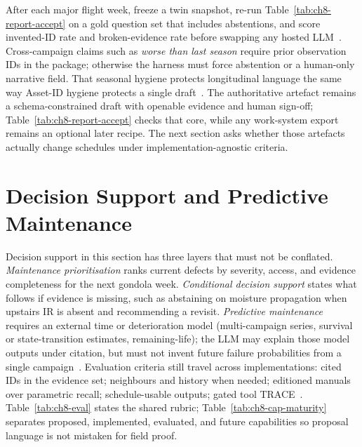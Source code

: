 After each major flight week, freeze a twin snapshot, re-run Table~\ref{tab:ch8-report-accept} on a gold question set that includes abstentions, and score invented-ID rate and broken-evidence rate before swapping any hosted LLM~\cite{liang2023helm,zhang2025}. Cross-campaign claims such as \emph{worse than last season} require prior observation IDs in the package; otherwise the harness must force abstention or a human-only narrative field. That seasonal hygiene protects longitudinal language the same way Asset-ID hygiene protects a single draft~\cite{chen2023facility,krutli2025fmrags}. The authoritative artefact remains a schema-constrained draft with openable evidence and human sign-off; Table~\ref{tab:ch8-report-accept} checks that core, while any work-system export remains an optional later recipe. The next section asks whether those artefacts actually change schedules under implementation-agnostic criteria.

\section{Decision Support and Predictive Maintenance}
\label{sec:ch8-dss}

Decision support in this section has three layers that must not be conflated. \emph{Maintenance prioritisation} ranks current defects by severity, access, and evidence completeness for the next gondola week. \emph{Conditional decision support} states what follows if evidence is missing, such as abstaining on moisture propagation when upstairs IR is absent and recommending a revisit. \emph{Predictive maintenance} requires an external time or deterioration model (multi-campaign series, survival or state-transition estimates, remaining-life); the LLM may explain those model outputs under citation, but must not invent future failure probabilities from a single campaign~\cite{chen2023facility,zhao2026physical}. Evaluation criteria still travel across implementations: cited IDs in the evidence set; neighbours and history when needed; editioned manuals over parametric recall; schedule-usable outputs; gated tool TRACE~\cite{ji2023,lee2024ragsafety,luo2025llmdtrobot}. Table~\ref{tab:ch8-eval} states the shared rubric; Table~\ref{tab:ch8-cap-maturity} separates proposed, implemented, evaluated, and future capabilities so proposal language is not mistaken for field proof.

